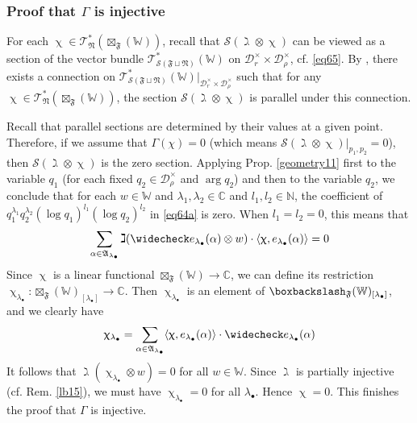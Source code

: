 \documentclass[11pt,b5paper,notitlepage]{article}
\theoremstyle{definition}
\theoremstyle{plain}
\newcommand{\fk}{\mathfrak}
\newcommand{\wch}{\widecheck}
\newcommand{\blt}{\bullet}
\newcommand{\Wbb}{\mathbb W}
\newcommand{\Cbb}{\mathbb C}
\newcommand{\Nbb}{\mathbb N}
\newcommand{\<}{\left\langle}
\renewcommand{\>}{\right\rangle}
\newcommand{\ST}{\mathscr{T}}
\newcommand{\MD}{\mathcal{D}}
\newcommand{\MS}{\mathcal{S}}
\newcommand{\bk}[1]{\langle {#1}\rangle}
\newcommand{\bbs}{\boxbackslash}
\newcommand{\fn}{\mathfrak{N}}
\newcommand{\ff}{\mathfrak{F}}
\numberwithin{equation}{section}
\begin{document}
\subsubsection{Proof that $\Gamma$ is injective}



For each $\upchi\in\ST^*_\fn(\boxtimes_\ff(\Wbb))$, recall that $\MS(\gimel\otimes\upchi)$ can be viewed as a section of the vector bundle $\ST^*_{\MS(\ff\sqcup\fn)}(\Wbb)$ on $\MD^\times_r\times\MD^\times_\rho$, cf. \eqref{eq65}. By \cite[Thm. 4.11]{GZ2}, there exists a connection on $\ST^*_{\MS(\ff\sqcup\fn)}(\Wbb)|_{\MD^\times_r\times\MD^\times_\rho}$ such that for any $\upchi\in\ST^*_\fn(\boxtimes_\ff(\Wbb))$, the section $\MS(\gimel\otimes\upchi)$ is parallel under this connection. 

Recall that parallel sections are determined by their values at a given point. Therefore, if we assume that $\Gamma(\chi)=0$ (which means $\MS(\gimel\otimes\upchi)|_{p_1,p_2}=0$), then  $\MS(\gimel\otimes\upchi)$ is the zero section. Applying Prop. \ref{geometry11} first to the variable $q_1$ (for each fixed $q_2\in\MD_\rho^\times$ and $\arg q_2$) and then to the variable $q_2$, we conclude that for each $w\in\Wbb$ and $\lambda_1,\lambda_2\in\Cbb$ and $l_1,l_2\in\Nbb$, the coefficient of $q_1^{\lambda_1}q_2^{\lambda_2}(\log q_1)^{l_1}(\log q_2)^{l_2}$ in \eqref{eq64a} is zero. When $l_1=l_2=0$, this means that
\begin{align*}
\sum_{\alpha\in\fk A_{\lambda_\blt}}\gimel(\wch e_{\lambda_\blt}(\alpha)\otimes w)\cdot\bk{\upchi,e_{\lambda_\blt}(\alpha)}=0
\end{align*}
Since $\upchi$ is a linear functional $\boxtimes_\ff(\Wbb)\rightarrow\Cbb$, we can define its restriction $\upchi_{\lambda_\blt}:\boxtimes_\ff(\Wbb)_{[\lambda_\blt]}\rightarrow\Cbb$. Then $\upchi_{\lambda_\blt}$ is an element of $\bbs_\ff(\Wbb)_{[\lambda_\blt]}$, and we clearly have
\begin{align*}
\upchi_{\lambda_\blt}=\sum_{\alpha\in\fk A_{\lambda_\blt}}\bk{\upchi,e_{\lambda_\blt}(\alpha)}\cdot \wch e_{\lambda_\blt}(\alpha)
\end{align*}
It follows that $\gimel(\upchi_{\lambda_\blt}\otimes w)=0$ for all $w\in\Wbb$. Since $\gimel$ is partially injective (cf. Rem. \ref{lb15}), we must have $\upchi_{\lambda_\blt}=0$ for all $\lambda_\blt$. Hence $\upchi=0$. This finishes the proof that $\Gamma$ is injective.
\end{document}
